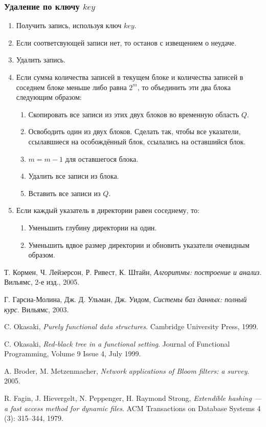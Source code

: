 \subsubsection{Удаление по ключу $key$}
\begin{enumerate}
  \item Получить запись, используя ключ $key$.
  \item Если соответсвующей записи нет, то останов с извещением о неудаче.
  \item Удалить запись.
  \item Если сумма количества записей в текущем блоке и количества записей в соседнем блоке меньше либо равна $2^m$, то объединить эти два блока следующим образом:
    \begin{enumerate}
      \item Скопировать все записи из этих двух блоков во временную область $Q$.
      \item Освободить один из двух блоков. Сделать так, чтобы все указатели, ссылавшиеся на особождённый блок, ссылались на оставшийся блок.
      \item $m = m - 1$ для оставшегося блока.
      \item Удалить все записи из блока.
      \item Вставить все записи из $Q$.
    \end{enumerate}
  \item Если каждый указатель в директории равен соседнему, то:
    \begin{enumerate}
      \item Уменьшить глубину директории на один.
      \item Уменьшить вдвое размер директории и обновить указатели очевидным образом.
    \end{enumerate}
\end{enumerate}

\begin{thebibliography}{9}

  Т. Кормен, Ч. Лейзерсон, Р. Ривест, К. Штайн,
  \emph{Алгоритмы: построение и анализ}.
  Вильямс,
  2-е изд.,
  2005.

  Г. Гарсиа-Молина, Дж. Д. Ульман, Дж. Уидом,
  \emph{Системы баз данных: полный курс}.
  Вильямс,
  2003.

  C. Okasaki,
  \emph{Purely functional data structures}.
  Cambridge University Press,
  1999.

  C. Okasaki,
  \emph{Red-black tree in a functional setting}.
  Journal of Functional Programming,
  Volume 9 Issue 4,
  July 1999.

  A. Broder, M. Metzenmacher,
  \emph{Network applications of Bloom filters: a survey}.
  2005.

  R. Fagin, J. Hievergelt, N. Peppenger, H. Raymond Strong,
  \emph{Extendible hashing — a fast access method for dynamic files}.
  ACM Transactions on Database Systems 4 (3): 315–344,
  1979.

\end{thebibliography}
